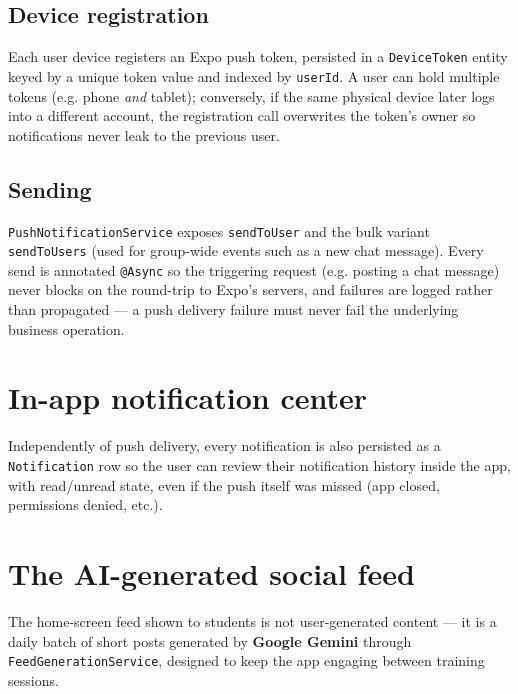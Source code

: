 \documentclass[a4paper,12pt]{report}
\begin{document}
\subsection{Device registration}
Each user device registers an Expo push token, persisted in a
\texttt{DeviceToken} entity keyed by a unique token value and indexed by
\texttt{userId}. A user can hold multiple tokens (e.g. phone \emph{and}
tablet); conversely, if the same physical device later logs into a
different account, the registration call overwrites the token's owner so
notifications never leak to the previous user.

\subsection{Sending}
\texttt{PushNotificationService} exposes \texttt{sendToUser} and the bulk
variant \texttt{sendToUsers} (used for group-wide events such as a new
chat message). Every send is annotated \texttt{@Async} so the triggering
request (e.g. posting a chat message) never blocks on the round-trip to
Expo's servers, and failures are logged rather than propagated --- a push
delivery failure must never fail the underlying business operation.

\section{In-app notification center}
Independently of push delivery, every notification is also persisted as a
\texttt{Notification} row so the user can review their notification
history inside the app, with read/unread state, even if the push itself
was missed (app closed, permissions denied, etc.).

\section{The AI-generated social feed}
The home-screen feed shown to students is not user-generated content ---
it is a daily batch of short posts generated by \textbf{Google Gemini}
through \texttt{FeedGenerationService}, designed to keep the app engaging
between training sessions.
\end{document}

